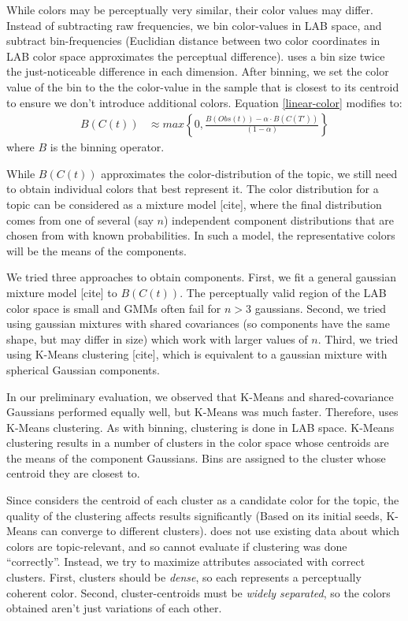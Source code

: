 While colors may be perceptually very similar, their color values may differ. Instead of subtracting raw frequencies, we bin color-values in LAB space, and subtract bin-frequencies (Euclidian distance between two color coordinates in LAB color space approximates the perceptual difference). \system uses a bin size twice the just-noticeable difference in each dimension. After binning, we set the color value of the bin to the the color-value in the sample that is closest to its centroid to ensure we don't introduce additional colors. Equation \ref{linear-color} modifies to:
\begin{align}
\label{linear-color-bin}  
B(C(t)) &\approx max\left\{0,\frac{B(Obs(t)) - \alpha \cdot B(C(T'))}{(1-\alpha)}\right\}
\end{align}
where $B$ is the binning operator.

While $B(C(t))$ approximates the color-distribution of the topic, we still need to obtain individual colors that best represent it. The color distribution for a topic can be considered as a mixture model [cite], where the final distribution comes from one of several (say $n$) independent component distributions that are chosen from with known probabilities. In such a model, the representative colors will be the means of the components. 

We tried three approaches to obtain components. First, we fit a general gaussian mixture model [cite] to $B(C(t))$. The perceptually valid region of the LAB color space is small and GMMs often fail for $n>3$ gaussians. Second, we tried using gaussian mixtures with shared covariances (so components have the same shape, but may differ in size) which work with larger values of $n$. Third, we tried using K-Means clustering [cite], which is equivalent to a gaussian mixture with spherical Gaussian components. 

In our preliminary evaluation, we observed that K-Means and shared-covariance Gaussians performed equally well, but K-Means was much faster. Therefore, \system uses K-Means clustering. As with binning, clustering is done in LAB space. K-Means clustering results in a number of clusters in the color space whose centroids are the means of the component Gaussians. Bins are assigned to the cluster whose centroid they are closest to. 

Since \system considers the centroid of each cluster as a candidate color for the topic, the quality of the clustering affects results significantly (Based on its initial seeds, K-Means can converge to different clusters). \system does not use existing data about which colors are topic-relevant, and so cannot evaluate if clustering was done ``correctly''. Instead, we try to maximize attributes associated with correct clusters. First, clusters should be \textit{dense}, so each represents a perceptually coherent color. Second, cluster-centroids must be \textit{widely separated}, so the colors obtained aren't just variations of each other. 


